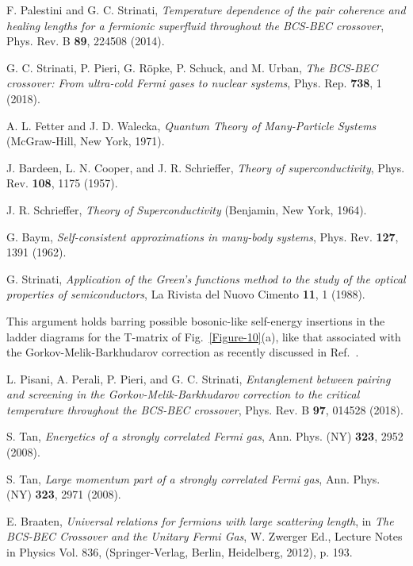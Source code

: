 \documentclass[pra,twocolumn,aps,amssymb,showpacs,superscriptaddress]{revtex4-1}
\begin{document}
\begin{thebibliography}{99}
 F. Palestini and G. C. Strinati, \emph{Temperature dependence of the pair coherence and healing lengths for a fermionic superfluid 
                                       throughout the BCS-BEC crossover}, Phys. Rev. B {\bf 89}, 224508 (2014).

 G. C. Strinati, P. Pieri, G. R\"{o}pke, P. Schuck, and M. Urban, \emph{The BCS-BEC crossover: 
                                                    From ultra-cold Fermi gases to nuclear systems}, Phys. Rep. {\bf 738}, 1 (2018).

 A. L. Fetter and J. D. Walecka, \emph{Quantum Theory of Many-Particle Systems} (McGraw-Hill, New York, 1971).

 J. Bardeen, L. N. Cooper, and J. R. Schrieffer, \emph{Theory of superconductivity}, Phys. Rev. {\bf 108}, 1175 (1957).

 J. R. Schrieffer, \emph{Theory of Superconductivity} (Benjamin, New York, 1964).

 G. Baym, \emph{Self-consistent approximations in many-body systems}, Phys. Rev. {\bf 127}, 1391 (1962).
                                                    
 G. Strinati, \emph{Application of the Green's functions method to the study of the optical properties of semiconductors}, La Rivista del Nuovo Cimento {\bf 11}, 1 (1988).

 This argument holds barring possible bosonic-like self-energy insertions in the ladder diagrams for the T-matrix of Fig.~\ref{Figure-10}(a), 
                                       like that associated with the Gorkov-Melik-Barkhudarov correction as recently discussed in Ref.~\cite{PPPS-2018}.

 L. Pisani, A. Perali, P. Pieri, and G. C. Strinati, \emph{Entanglement between pairing and screening in the Gorkov-Melik-Barkhudarov correction to the critical temperature 
                                   throughout the BCS-BEC crossover}, Phys. Rev. B {\bf 97}, 014528 (2018).

 S. Tan, \emph{Energetics of a strongly correlated Fermi gas}, Ann. Phys. (NY) {\bf 323}, 2952 (2008).

 S. Tan, \emph{Large momentum part of a strongly correlated Fermi gas}, Ann. Phys. (NY) {\bf 323}, 2971 (2008).

 E. Braaten, \emph{Universal relations for fermions with large scattering length}, in \emph{The BCS-BEC Crossover and the Unitary Fermi Gas}, 
                                      W. Zwerger Ed., Lecture Notes in Physics Vol. 836, (Springer-Verlag, Berlin, Heidelberg, 2012), p. 193. 


\end{thebibliography}
\end{document}
